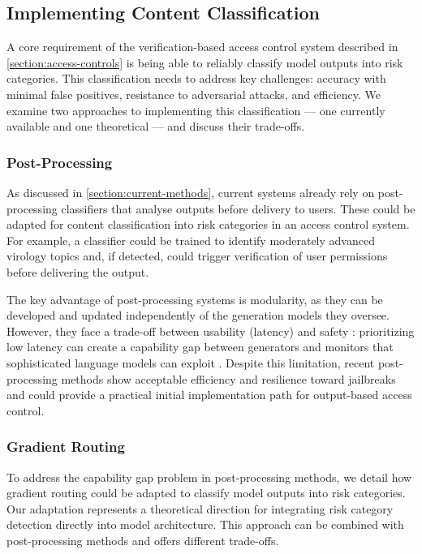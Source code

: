 \documentclass{article}
\theoremstyle{plain}
\theoremstyle{definition}
\theoremstyle{remark}
\begin{document}
\subsection{Implementing Content Classification} \label{section:content-classification}

A core requirement of the verification-based access control system
described in \cref{section:access-controls} is being able to reliably
classify model outputs into risk categories.
This classification needs to address key challenges: accuracy with
minimal false positives, resistance to adversarial attacks, and efficiency.
We examine two approaches to implementing this classification --- one
currently available and one theoretical --- and discuss their trade-offs.

\subsubsection{Post-Processing}

As discussed in \cref{section:current-methods}, current systems
already rely on post-processing classifiers that analyse outputs
before delivery to users.
These could be adapted for content classification into risk
categories in an access control system.
For example, a classifier could be trained to identify moderately
advanced virology topics and, if detected, could trigger verification
of user permissions before delivering the output.

The key advantage of post-processing systems is modularity, as they
can be developed and updated independently of the generation models
they oversee.
However, they face a trade-off between usability (latency) and safety
\cite{kumar2025freelunchguardrails}: prioritizing low latency can
create a capability gap between generators and monitors that
sophisticated language models can exploit
\cite{jin2024jailbreakinglargelanguagemodels}.
Despite this limitation, recent post-processing methods show
acceptable efficiency and resilience toward jailbreaks
\cite{sharma2025constitutionalclassifiersdefendinguniversal} and
could provide a practical initial implementation path for
output-based access control.

\subsubsection{Gradient Routing} \label{section:gradient-routing}

To address the capability gap problem in post-processing methods, we
detail how gradient routing \cite{cloud2024gradientroutingmaskinggradients}
could be adapted to classify model outputs into risk categories.
Our adaptation represents a theoretical direction for integrating
risk category detection directly into model architecture.
This approach can be combined with post-processing methods and offers
different trade-offs.
\end{document}
